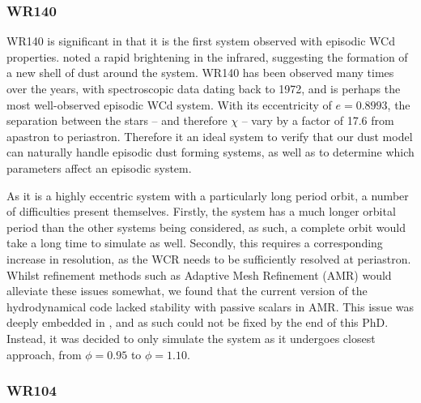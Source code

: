 \subsubsection{WR140}

WR140 is significant in that it is the first system observed with episodic WCd properties.
\textcite{williamsCondensationShellHD1978} noted a rapid brightening in the infrared, suggesting the formation of a new shell of dust around the system.
WR140 has been observed many times over the years, with spectroscopic data dating back to 1972, and is perhaps the most well-observed episodic WCd system.
With its eccentricity of $e=0.8993$, the separation between the stars -- and therefore $\chi$ -- vary by a factor of 17.6 from apastron to periastron.
Therefore it an ideal system to verify that our dust model can naturally handle episodic dust forming systems, as well as to determine which parameters affect an episodic system.

As it is a highly eccentric system with a particularly long period orbit, a number of difficulties present themselves.
Firstly, the system has a much longer orbital period than the other systems being considered, as such, a complete orbit would take a long time to simulate as well.
Secondly, this requires a corresponding increase in resolution, as the WCR needs to be sufficiently resolved at periastron.
Whilst refinement methods such as Adaptive Mesh Refinement (AMR) would alleviate these issues somewhat, we found that the current version of the \athena{} hydrodynamical code lacked stability with passive scalars in AMR.
This issue was deeply embedded in \athena{}, and as such could not be fixed by the end of this PhD.
Instead, it was decided to only simulate the system as it undergoes closest approach, from $\phi = 0.95$ to $\phi = 1.10$. 

\subsubsection{WR104}

